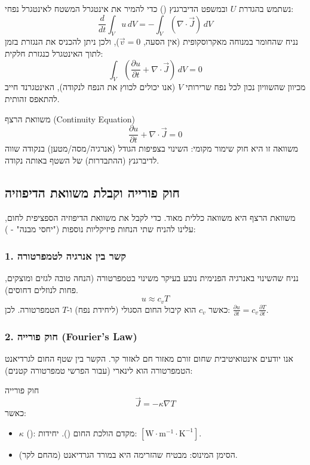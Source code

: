 נשתמש בהגדרת $U$ ובמשפט הדיברגנץ () כדי להמיר את אינטגרל המשטח לאינטגרל נפחי:
\[
\frac{d}{dt} \int_V u \, dV = - \int_V (\nabla \cdot \vec{J}) \, dV
\]
נניח שהחומר במנוחה מאקרוסקופית (אין הסעה, $\vec{v}=0$), ולכן ניתן להכניס את הנגזרת בזמן לתוך האינטגרל כנגזרת חלקית:
\[
\int_V \left( \frac{\partial u}{\partial t} + \nabla \cdot \vec{J} \right) \, dV = 0
\]
מכיוון שהשוויון נכון לכל נפח שרירותי $V$ (אנו יכולים לכווץ את הנפח לנקודה), האינטגרנד חייב להתאפס זהותית.

\begin{resultbox}{משוואת הרצף (Continuity Equation)}
\[
\boxed{\frac{\partial u}{\partial t} + \nabla \cdot \vec{J} = 0}
\]
משוואה זו היא חוק שימור מקומי: השינוי בצפיפות הגודל (אנרגיה/מסה/מטען) בנקודה שווה לדיברגנץ (ההתבדרות) של השטף באותה נקודה.
\end{resultbox}

\subsection{חוק פורייה וקבלת משוואת הדיפוזיה}

משוואת הרצף היא משוואה כללית מאוד. כדי לקבל את משוואת הדיפוזיה הספציפית לחום, עלינו להניח שתי הנחות פיזיקליות נוספות ("יחסי מבנה" - ):

\subsubsection{1. קשר בין אנרגיה לטמפרטורה}
נניח שהשינוי באנרגיה הפנימית נובע בעיקר משינוי בטמפרטורה (הנחה טובה לגזים ומוצקים, פחות לנוזלים דחוסים).
\[
u \approx c_v T
\]
כאשר $c_v$ הוא קיבול החום הסגולי (ליחידת נפח) ו-$T$ הטמפרטורה.
לכן: $\frac{\partial u}{\partial t} = c_v \frac{\partial T}{\partial t}$.

\subsubsection{2. חוק פורייה (Fourier's Law)}
אנו יודעים אינטואיטיבית שחום זורם מאזור חם לאזור קר. הקשר בין שטף החום לגרדיאנט הטמפרטורה הוא לינארי (עבור הפרשי טמפרטורה קטנים):

\begin{definitionbox}{חוק פורייה}
\[
\vec{J} = -\kappa \nabla T
\]
כאשר:
\begin{itemize}
    \item $\kappa$ (): מקדם הולכת החום (). יחידות: $[\text{W}\cdot\text{m}^{-1}\cdot\text{K}^{-1}]$.
    \item הסימן המינוס: מבטיח שהזרימה היא במורד הגרדיאנט (מהחם לקר).
\end{itemize}
\end{definitionbox}

